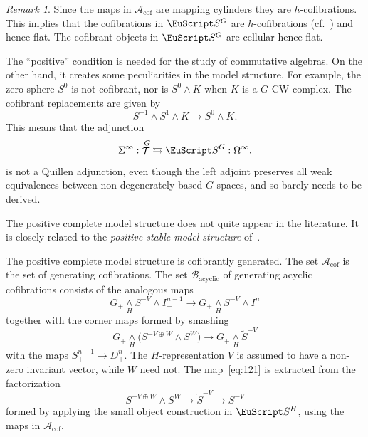 \documentclass{amsart}
\newtheorem{rem}[equation]{Remark}
\theoremstyle{definition}
\theoremstyle{remark}
\newtheorem{rem}[equation]{Remark}
\newcommand{\spectra}{\EuScript S}
\DeclareMathOperator{\spaces}{\mathcal T}
\newcommand{\ugspaces}[1]{\spaces^{#1}}
\newcommand{\ugspectra}[1]{\spectra^{#1}}
\newcommand{\gencof}{\mathcal A_{\text{cof}}}
\newcommand{\genacyclic}{\mathcal B_{\text{acyclic}}}
\begin{document}
\begin{rem}
\label{rem:38} Since the maps in $\gencof$ are mapping cylinders
they are $h$-cofibrations.  This implies that the cofibrations in
$\ugspectra{G}$ are $h$-cofibrations (cf.~\cite[Lemma
III.2.5]{MR1922205}) and hence flat.  The cofibrant objects in
$\ugspectra{G}$ are cellular hence flat.
\end{rem}

The ``positive'' condition is needed for the study of commutative
algebras.  On the other hand, it creates some peculiarities in the
model structure.  For example, the zero sphere $S^{0}$ is not
cofibrant, nor is $S^{0}\wedge K$ when $K$ is a $G$-CW complex.  The
cofibrant replacements are given by
\[
S^{-1}\wedge S^{1}\wedge K\to S^{0}\wedge K.
\]
This means that  the adjunction
\[
\Sigma^{\infty}:\ugspaces{G} \leftrightarrows \ugspectra{G}: \Omega^{\infty}.
\]
is not a Quillen adjunction, even though the left adjoint preserves
all weak equivalences between non-degenerately based $G$-spaces, and
so barely needs to be derived.

The positive complete model structure does not quite appear in the
literature.  It is closely related to the {\em positive stable model
structure} of~\cite{MR1922205}.

The positive complete model structure is cofibrantly generated.
The set $\gencof$ is the set of generating cofibrations.  The set
$\genacyclic$ of generating acyclic cofibrations consists of the
analogous maps
\begin{equation}
\label{eq:172}
G_{+}\underset{H}{\wedge}S^{-V}\wedge I^{n-1}_{+}\to
G_{+}\underset{H}{\wedge}S^{-V}\wedge I^{n}
\end{equation}
together with the corner maps formed by smashing 
\begin{equation}
\label{eq:121}
G_{+}\underset{H}{\wedge}\big(S^{-V\oplus W}\wedge S^{W}\big)\to G_{+}\underset{H}{\wedge}\tilde S^{-V}
\end{equation}
with the maps $S^{n-1}_{+}\to D^{n}_{+}$.  The $H$-representation $V$
is assumed to have a non-zero invariant vector, while $W$ need not.
The map~\eqref{eq:121} is extracted from the factorization
\begin{equation}
\label{eq:147}
S^{-V\oplus W}\wedge S^{W}\to \tilde S^{-V} \to S^{-V}
\end{equation}
formed by applying the small object construction in $\ugspectra{H}$,
using the maps in $\gencof$.
\end{document}
